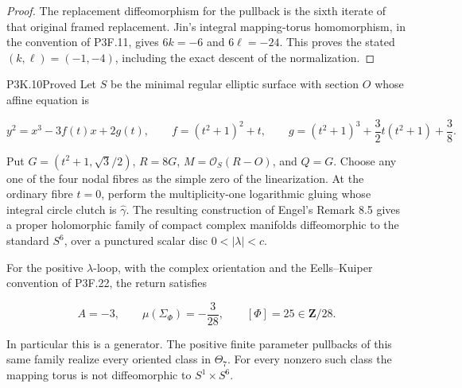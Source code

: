 \begin{proof}
The replacement diffeomorphism for the pullback is the sixth
iterate of that original framed replacement.  Jin's integral
mapping-torus homomorphism, in the convention of P3F.11, gives
\(6k=-6\) and \(6\ell=-24\).  This proves the stated
\((k,\ell)=(-1,-4)\), including the exact descent of the
normalization.
\end{proof}

\begin{statement}{P3K.10}{Proved}
Let \(S\) be the minimal regular elliptic surface with section \(O\)
whose affine equation is

\[
 y^2=x^3-3f(t)x+2g(t),\qquad
 f=(t^2+1)^2+t,\qquad
 g=(t^2+1)^3+\frac32t(t^2+1)+\frac38.
\]

Put \(G=(t^2+1,\sqrt3/2)\), \(R=8G\),
\(M=\mathcal O_S(R-O)\), and \(Q=G\).  Choose any one of the four
nodal fibres as the simple zero of the linearization.  At the
ordinary fibre \(t=0\), perform the multiplicity-one logarithmic
gluing whose integral circle clutch is \(\widehat\gamma\).
The resulting construction of Engel's Remark 8.5 gives a proper
holomorphic family of compact complex manifolds diffeomorphic to
the standard \(S^6\), over a punctured scalar disc
\(0<|\lambda|<c\).

For the positive \(\lambda\)-loop, with the complex orientation and
the Eells--Kuiper convention of P3F.22, the return satisfies

\[
 A=-3,\qquad \mu(\Sigma_\Phi)=-\frac3{28},\qquad
 [\Phi]=25\in\mathbf Z/28.
\]

In particular this is a generator.  The positive finite parameter
pullbacks of this same family realize every oriented class in
\(\Theta_7\).  For every nonzero such class the mapping torus is
not diffeomorphic to \(S^1\times S^6\).
\end{statement}

